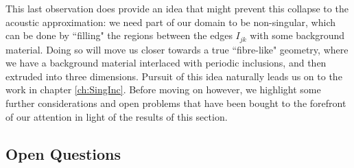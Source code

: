This last observation does provide an idea that might prevent this collapse to the acoustic approximation:  we need part of our domain to be non-singular, which can be done by ``filling" the regions between the edges $I_{jk}$ with some background material.
Doing so will move us closer towards a true ``fibre-like" geometry, where we have a background material interlaced with periodic inclusions, and then extruded into three dimensions.
Pursuit of this idea naturally leads us on to the work in chapter \ref{ch:SingInc}.
Before moving on however, we highlight some further considerations and open problems that have been bought to the forefront of our attention in light of the results of this section.

\subsection{Open Questions} \label{ssec:CC-OpenQuestions}

